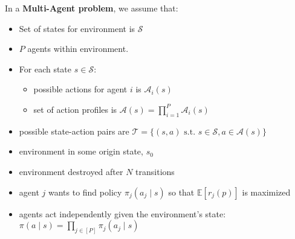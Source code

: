 \begin{summary}
    In a \textbf{Multi-Agent problem}, we assume that:
    \begin{itemize}
        \item Set of states for environment is $\mathcal{S}$
        \item $P$ agents within environment. 
        \item For each state $s \in \mathcal{S}$: 
        \begin{itemize}
            \item possible actions for agent $i$ is $\mathcal{A}_i(s)$
            \item set of action profiles is $\mathcal{A}(s) = \prod_{i=1}^P \mathcal{A}_i(s)$
        \end{itemize}
        \item possible state-action pairs are $\mathcal{T} = \{(s,a) \text{ s.t. } s \in \mathcal{S}, a \in \mathcal{A}(s)\}$
        \item environment in some origin state, $s_0$ 
        \item environment destroyed after $N$ transitions 
        \item agent $j$ wants to find policy $\pi_j (a_j \mid s)$ so that $\mathbb{E}[r_j(p)]$ is maximized
        \item agents act independently given the environment's state: $\pi (a \mid s) = \prod_{j\in [P]} \pi_j (a_j \mid s)$
    \end{itemize}


\end{summary}
